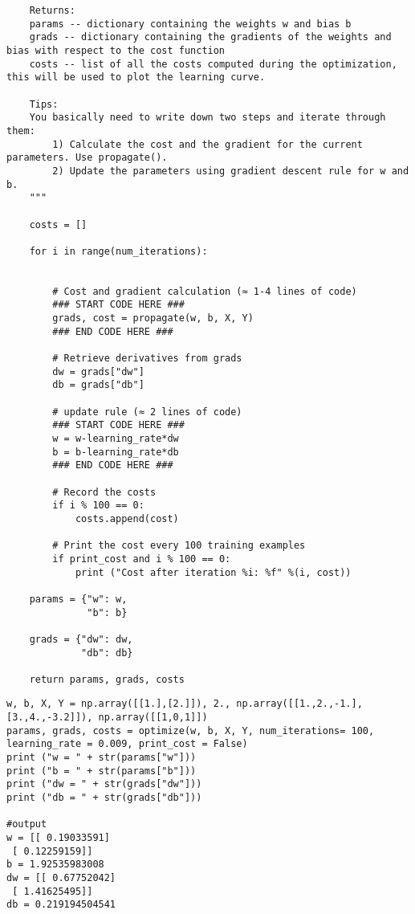 {{\begin{verbatim}
    Returns:
    params -- dictionary containing the weights w and bias b
    grads -- dictionary containing the gradients of the weights and bias with respect to the cost function
    costs -- list of all the costs computed during the optimization, this will be used to plot the learning curve.
    
    Tips:
    You basically need to write down two steps and iterate through them:
        1) Calculate the cost and the gradient for the current parameters. Use propagate().
        2) Update the parameters using gradient descent rule for w and b.
    """
    
    costs = []
    
    for i in range(num_iterations):
        
        
        # Cost and gradient calculation (≈ 1-4 lines of code)
        ### START CODE HERE ### 
        grads, cost = propagate(w, b, X, Y)
        ### END CODE HERE ###
        
        # Retrieve derivatives from grads
        dw = grads["dw"]
        db = grads["db"]
        
        # update rule (≈ 2 lines of code)
        ### START CODE HERE ###
        w = w-learning_rate*dw
        b = b-learning_rate*db
        ### END CODE HERE ###
        
        # Record the costs
        if i % 100 == 0:
            costs.append(cost)
        
        # Print the cost every 100 training examples
        if print_cost and i % 100 == 0:
            print ("Cost after iteration %i: %f" %(i, cost))
    
    params = {"w": w,
              "b": b}
    
    grads = {"dw": dw,
             "db": db}
    
    return params, grads, costs
\end{verbatim}


\begin{verbatim}
w, b, X, Y = np.array([[1.],[2.]]), 2., np.array([[1.,2.,-1.],[3.,4.,-3.2]]), np.array([[1,0,1]])
params, grads, costs = optimize(w, b, X, Y, num_iterations= 100, learning_rate = 0.009, print_cost = False)
print ("w = " + str(params["w"]))
print ("b = " + str(params["b"]))
print ("dw = " + str(grads["dw"]))
print ("db = " + str(grads["db"]))

#output
w = [[ 0.19033591]
 [ 0.12259159]]
b = 1.92535983008
dw = [[ 0.67752042]
 [ 1.41625495]]
db = 0.219194504541
\end{verbatim}



}}
